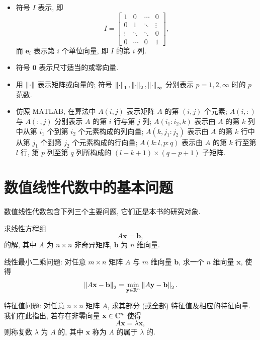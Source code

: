 \begin{itemize}
  \item 符号 $I$ 表示, 即
  \[
    I = \begin{bmatrix}
      1      & 0      & \cdots & 0      \\
      0      & 1      & \ddots & \vdots \\
      \vdots & \ddots & \ddots & 0      \\
      0      & \cdots & 0      & 1
    \end{bmatrix},
  \]
  而 $\mathbf{e}_i$ 表示第 $i$ 个单位向量, 即 $I$ 的第 $i$ 列.

  \item 符号 $\mathbf{0}$ 表示尺寸适当的或零向量.

  \item 用 $\left\|\cdot\right\|$ 表示矩阵或向量的; 符号 $\left\|\cdot\right\|_1,\left\|\cdot\right\|_2,\left\|\cdot\right\|_\infty$ 分别表示 $p=1,2,\infty$ 时的 $p$ 范数.

  \item 仿照 MATLAB, 在算法中 $A(i,j)$ 表示矩阵 $A$ 的第 $(i,j)$ 个元素; $A(i,:)$ 与 $A(:,j)$ 分别表示 $A$ 的第 $i$ 行与第 $j$ 列; $A(i_1:i_2,k)$ 表示由 $A$ 的第 $k$ 列中从第 $i_1$ 个到第 $i_2$ 个元素构成的列向量; $A(k,j_1:j_2)$ 表示由 $A$ 的第 $k$ 行中从第 $j_1$ 个到第 $j_2$ 个元素构成的行向量; $A(k:l,p:q)$ 表示由 $A$ 的第 $k$ 行至第 $l$ 行, 第 $p$ 列至第 $q$ 列所构成的 $(l-k+1)\times(q-p+1)$ 子矩阵.
\end{itemize}

\section{数值线性代数中的基本问题}
\label{sec:ch1-basicproblems}

数值线性代数包含下列三个主要问题, 它们正是本书的研究对象.

\begin{parenlist}
  \item 求线性方程组
    \[
      A\mathbf{x}=\mathbf{b},
    \]
    的解, 其中 $A$ 为 $n\times n$ 非奇异矩阵, $\mathbf{b}$ 为 $n$ 维向量.

  \item 线性最小二乘问题: 对任意 $m\times n$ 矩阵 $A$ 与 $m$ 维向量 $\mathbf{b}$, 求一个 $n$ 维向量 $\mathbf{x}$, 使得
    \[
      \left\|A\mathbf{x}-\mathbf{b}\right\|_2 = \min_{\mathbf{y}\in\mathbb{R}^n}\left\|A\mathbf{y}-\mathbf{b}\right\|_2.
    \]

  \item 特征值问题: 对任意 $n\times n$ 矩阵 $A$, 求其部分 (或全部) 特征值及相应的特征向量. 我们在此指出, 若存在非零向量 $\mathbf{x}\in\mathbb{C}^n$ 使得
    \[
      A\mathbf{x}=\lambda\mathbf{x},
    \]
    则称复数 $\lambda$ 为 $A$ 的, 其中 $\mathbf{x}$ 称为 $A$ 的属于 $\lambda$ 的.
\end{parenlist}

